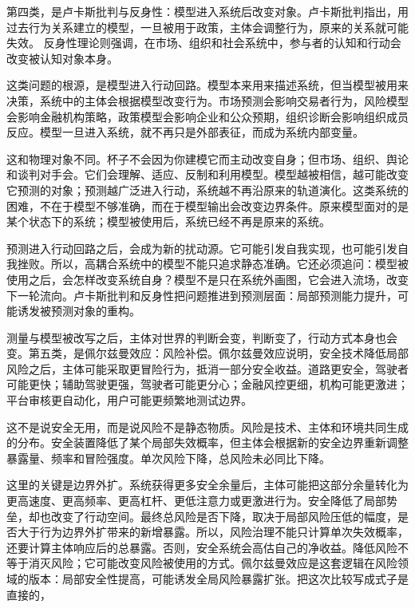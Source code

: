 第四类，是卢卡斯批判与反身性：模型进入系统后改变对象。卢卡斯批判指出，用过去行为关系建立的模型，一旦被用于政策，主体会调整行为，原来的关系就可能失效。\cite{lucas1976econometric} 反身性理论则强调，在市场、组织和社会系统中，参与者的认知和行动会改变被认知对象本身。\cite{soros1987alchemy}

这类问题的根源，是模型进入行动回路。模型本来用来描述系统，但当模型被用来决策，系统中的主体会根据模型改变行为。市场预测会影响交易者行为，风险模型会影响金融机构策略，政策模型会影响企业和公众预期，组织诊断会影响组织成员反应。模型一旦进入系统，就不再只是外部表征，而成为系统内部变量。

这和物理对象不同。杯子不会因为你建模它而主动改变自身；但市场、组织、舆论和谈判对手会。它们会理解、适应、反制和利用模型。模型越被相信，越可能改变它预测的对象；预测越广泛进入行动，系统越不再沿原来的轨道演化。这类系统的困难，不在于模型不够准确，而在于模型输出会改变边界条件。原来模型面对的是某个状态下的系统；模型被使用后，系统已经不再是原来的系统。

预测进入行动回路之后，会成为新的扰动源。它可能引发自我实现，也可能引发自我挫败。所以，高耦合系统中的模型不能只追求静态准确。它还必须追问：模型被使用之后，会怎样改变系统自身？模型不是只在系统外画图，它会进入流场，改变下一轮流向。卢卡斯批判和反身性把问题推进到预测层面：局部预测能力提升，可能诱发被预测对象的重构。


测量与模型被改写之后，主体对世界的判断会变，判断变了，行动方式本身也会变。第五类，是佩尔兹曼效应：风险补偿。佩尔兹曼效应说明，安全技术降低局部风险之后，主体可能采取更冒险行为，抵消一部分安全收益。道路更安全，驾驶者可能更快；辅助驾驶更强，驾驶者可能更分心；金融风控更细，机构可能更激进；平台审核更自动化，用户可能更频繁地测试边界。\cite{peltzman1975effects}

这不是说安全无用，而是说风险不是静态物质。风险是技术、主体和环境共同生成的分布。安全装置降低了某个局部失效概率，但主体会根据新的安全边界重新调整暴露量、频率和冒险强度。单次风险下降，总风险未必同比下降。

这里的关键是边界外扩。系统获得更多安全余量后，主体可能把这部分余量转化为更高速度、更高频率、更高杠杆、更低注意力或更激进行为。安全降低了局部势垒，却也改变了行动空间。最终总风险是否下降，取决于局部风险压低的幅度，是否大于行为边界外扩带来的新增暴露。所以，风险治理不能只计算单次失效概率，还要计算主体响应后的总暴露。否则，安全系统会高估自己的净收益。降低风险不等于消灭风险；它可能改变风险被使用的方式。佩尔兹曼效应是这套逻辑在风险领域的版本：局部安全性提高，可能诱发全局风险暴露扩张。把这次比较写成式子是直接的，

